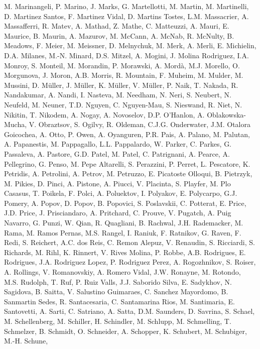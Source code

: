 M. Marinangeli,
P. Marino,
J. Marks,
G. Martellotti,
M. Martin,
M. Martinelli,
D. Martinez Santos,
F. Martinez Vidal,
D. Martins Tostes,
L.M. Massacrier,
A. Massafferri,
R. Matev,
A. Mathad,
Z. Mathe,
C. Matteuzzi,
A. Mauri,
E. Maurice,
B. Maurin,
A. Mazurov,
M. McCann,
A. McNab,
R. McNulty,
B. Meadows,
F. Meier,
M. Meissner,
D. Melnychuk,
M. Merk,
A. Merli,
E. Michielin,
D.A. Milanes,
M.-N. Minard,
D.S. Mitzel,
A. Mogini,
J. Molina Rodriguez,
I.A. Monroy,
S. Monteil,
M. Morandin,
P. Morawski,
A. Mord{\`a},
M.J. Morello,
O. Morgunova,
J. Moron,
A.B. Morris,
R. Mountain,
F. Muheim,
M. Mulder,
M. Mussini,
D. M{\"u}ller,
J. M{\"u}ller,
K. M{\"u}ller,
V. M{\"u}ller,
P. Naik,
T. Nakada,
R. Nandakumar,
A. Nandi,
I. Nasteva,
M. Needham,
N. Neri,
S. Neubert,
N. Neufeld,
M. Neuner,
T.D. Nguyen,
C. Nguyen-Mau,
S. Nieswand,
R. Niet,
N. Nikitin,
T. Nikodem,
A. Nogay,
A. Novoselov,
D.P. O'Hanlon,
A. Oblakowska-Mucha,
V. Obraztsov,
S. Ogilvy,
R. Oldeman,
C.J.G. Onderwater,
J.M. Otalora Goicochea,
A. Otto,
P. Owen,
A. Oyanguren,
P.R. Pais,
A. Palano,
M. Palutan,
A. Papanestis,
M. Pappagallo,
L.L. Pappalardo,
W. Parker,
C. Parkes,
G. Passaleva,
A. Pastore,
G.D. Patel,
M. Patel,
C. Patrignani,
A. Pearce,
A. Pellegrino,
G. Penso,
M. Pepe Altarelli,
S. Perazzini,
P. Perret,
L. Pescatore,
K. Petridis,
A. Petrolini,
A. Petrov,
M. Petruzzo,
E. Picatoste Olloqui,
B. Pietrzyk,
M. Pikies,
D. Pinci,
A. Pistone,
A. Piucci,
V. Placinta,
S. Playfer,
M. Plo Casasus,
T. Poikela,
F. Polci,
A. Poluektov,
I. Polyakov,
E. Polycarpo,
G.J. Pomery,
A. Popov,
D. Popov,
B. Popovici,
S. Poslavskii,
C. Potterat,
E. Price,
J.D. Price,
J. Prisciandaro,
A. Pritchard,
C. Prouve,
V. Pugatch,
A. Puig Navarro,
G. Punzi,
W. Qian,
R. Quagliani,
B. Rachwal,
J.H. Rademacker,
M. Rama,
M. Ramos Pernas,
M.S. Rangel,
I. Raniuk,
F. Ratnikov,
G. Raven,
F. Redi,
S. Reichert,
A.C. dos Reis,
C. Remon Alepuz,
V. Renaudin,
S. Ricciardi,
S. Richards,
M. Rihl,
K. Rinnert,
V. Rives Molina,
P. Robbe,
A.B. Rodrigues,
E. Rodrigues,
J.A. Rodriguez Lopez,
P. Rodriguez Perez,
A. Rogozhnikov,
S. Roiser,
A. Rollings,
V. Romanovskiy,
A. Romero Vidal,
J.W. Ronayne,
M. Rotondo,
M.S. Rudolph,
T. Ruf,
P. Ruiz Valls,
J.J. Saborido Silva,
E. Sadykhov,
N. Sagidova,
B. Saitta,
V. Salustino Guimaraes,
C. Sanchez Mayordomo,
B. Sanmartin Sedes,
R. Santacesaria,
C. Santamarina Rios,
M. Santimaria,
E. Santovetti,
A. Sarti,
C. Satriano,
A. Satta,
D.M. Saunders,
D. Savrina,
S. Schael,
M. Schellenberg,
M. Schiller,
H. Schindler,
M. Schlupp,
M. Schmelling,
T. Schmelzer,
B. Schmidt,
O. Schneider,
A. Schopper,
K. Schubert,
M. Schubiger,
M.-H. Schune,

